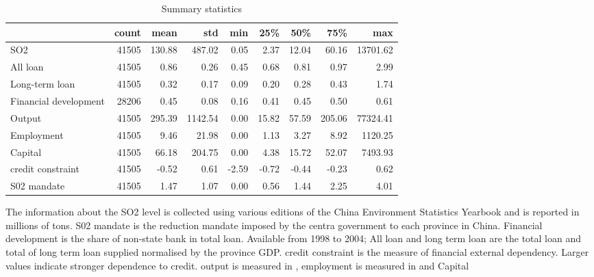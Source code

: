 \documentclass[preview]{standalone}
\begin{document}
\begin{table}[!htbp] \centering
\caption{Summary statistics}

\begin{adjustbox}{width=\textwidth, totalheight=\baselineskip,keepaspectratio}
\begin{tabular}{lrrrrrrrr}
\toprule
{} &  count &    mean &      std &   min &    25\% &    50\% &     75\% &       max \\
\midrule
SO2                   &  41505 &  130.88 &   487.02 &  0.05 &   2.37 &  12.04 &   60.16 &  13701.62 \\
All loan              &  41505 &    0.86 &     0.26 &  0.45 &   0.68 &   0.81 &    0.97 &      2.99 \\
Long-term loan        &  41505 &    0.32 &     0.17 &  0.09 &   0.20 &   0.28 &    0.43 &      1.74 \\
Financial development &  28206 &    0.45 &     0.08 &  0.16 &   0.41 &   0.45 &    0.50 &      0.61 \\
Output                &  41505 &  295.39 &  1142.54 &  0.00 &  15.82 &  57.59 &  205.06 &  77324.41 \\
Employment            &  41505 &    9.46 &    21.98 &  0.00 &   1.13 &   3.27 &    8.92 &   1120.25 \\
Capital               &  41505 &   66.18 &   204.75 &  0.00 &   4.38 &  15.72 &   52.07 &   7493.93 \\
credit constraint     &  41505 &   -0.52 &     0.61 & -2.59 &  -0.72 &  -0.44 &   -0.23 &      0.62 \\
S02 mandate           &  41505 &    1.47 &     1.07 &  0.00 &   0.56 &   1.44 &    2.25 &      4.01 \\
\bottomrule
\end{tabular}

\end{adjustbox}

\begin{tablenotes}
\small
\item
The information about the SO2 level is collected using various editions of the China Environment Statistics Yearbook and is reported in millions of tons.
S02 mandate is the reduction mandate imposed by the centra government to each province in China.
Financial development is the share of non-state bank in total loan. Available from 1998 to 2004; All loan and long term loan are the total loan and total of long term loan supplied
normalised by the province GDP.
credit constraint is the measure of financial external dependency. Larger values indicate stronger dependence to credit.
output is measured in ,  employment is measured in and Capital 

\end{tablenotes}
\end{table}
\end{document}
